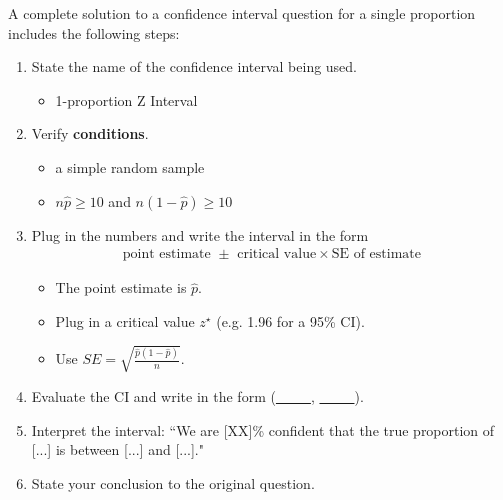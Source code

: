 
%
%

\begin{termBox}{
A complete solution to a confidence interval question for a single proportion includes the following steps:
\begin{enumerate}
\setlength{\itemsep}{0mm}
\item State the name of the confidence interval being used.\vspace{-1.5mm}
\begin{itemize}
\item 1-proportion Z Interval
\end{itemize}
\item Verify \textbf{conditions}.\vspace{-1.5mm}
\begin{itemize}
\setlength{\itemsep}{0mm}
\item a simple random sample
\item $n\hat{p} \geq10$ and $n(1-\hat{p})\geq10$
\end{itemize}
\item Plug in the numbers and write the interval in the form\vspace{-1.5mm}
\begin{align*}
\text{point estimate } \pm \text{ critical value}\times \text{SE of estimate}
\end{align*}
\begin{itemize}
\item The point estimate is $\hat{p}$.
\item Plug in a critical value $z^\star$ (e.g. 1.96 for a 95\% CI).
\item Use $SE = \sqrt{\frac{\hat{p}(1-\hat{p})}{n}}$.
\end{itemize}
\item Evaluate the CI and write in the form (\underline{\ \ \ \ \ }, \underline{\ \ \ \ \ }).
\item Interpret the interval:  ``We are [XX]\% confident that the true proportion of [...] is between [...] and [...]."
\item State your conclusion to the original question.
\end{enumerate}}
\end{termBox}

